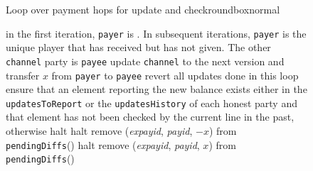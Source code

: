   \begin{figure}[H]
    \begin{titlebox}{\normalfont Loop over payment hops for update and
    check}{roundbox}{normal}
      \begin{algorithmic}[1]
        \label{alg:fpaynet:resolvepay:loops:update:loop}
          \State in the first iteration, \texttt{payer} is \dave. In
          subsequent iterations, \texttt{payer} is the unique player that
          has received but has not given. The other \texttt{channel} party
          is \texttt{payee}
            \State update \texttt{channel} to the next version and
            transfer $x$ from \texttt{payer} to \texttt{payee}
            \label{alg:fpaynet:resolvepay:loops:update:do}
          \Else
            \State revert all updates done in this loop
          \EndIf
        \EndFor
        \label{alg:fpaynet:resolvepay:loops:halt:loop}
          \State ensure that an element reporting the new balance exists
          either in the \texttt{updatesToReport} or the \texttt{updatesHistory}
          of each honest party and that element has not been checked by
          the current line in the past, otherwise halt
          \label{alg:fpaynet:resolvepay:loops:halt:do}
        \EndFor
         
        \label{alg:fpaynet:resolvepay:loops:indiffs:debit:cond}
          \State halt
          \label{alg:fpaynet:resolvepay:loops:indiffs:debit:halt}
        \EndIf
        \State remove (\textit{expayid}, \textit{payid}, $-x$) from
        \texttt{pendingDiffs}(\alice)
         
        \label{alg:fpaynet:resolvepay:loops:indiffs:credit:cond}
          \State halt
          \label{alg:fpaynet:resolvepay:loops:indiffs:credit:halt}
        \EndIf
        \State remove (\textit{expayid}, \textit{payid}, $x$) from
        \texttt{pendingDiffs}(\bob)
      \end{algorithmic}
    \end{titlebox}
    \caption{}
    \label{alg:fpaynet:resolvepay:loops}
  \end{figure}

